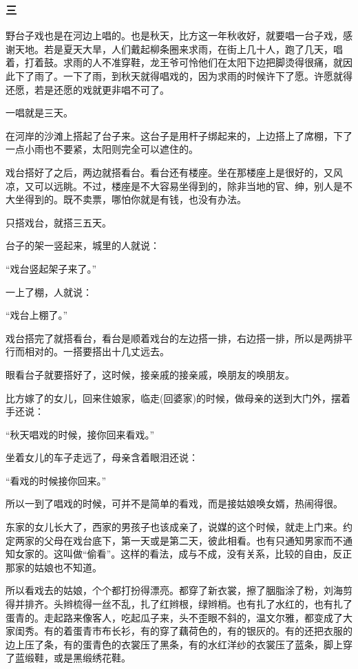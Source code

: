 \subsubsection*{三}
\par 野台子戏也是在河边上唱的。也是秋天，比方这一年秋收好，就要唱一台子戏，感谢天地。若是夏天大旱，人们戴起柳条圈来求雨，在街上几十人，跑了几天，唱着，打着鼓。求雨的人不准穿鞋，龙王爷可怜他们在太阳下边把脚烫得很痛，就因此下了雨了。一下了雨，到秋天就得唱戏的，因为求雨的时候许下了愿。许愿就得还愿，若是还愿的戏就更非唱不可了。
\par 一唱就是三天。
\par 在河岸的沙滩上搭起了台子来。这台子是用杆子绑起来的，上边搭上了席棚，下了一点小雨也不要紧，太阳则完全可以遮住的。
\par 戏台搭好了之后，两边就搭看台。看台还有楼座。坐在那楼座上是很好的，又风凉，又可以远眺。不过，楼座是不大容易坐得到的，除非当地的官、绅，别人是不大坐得到的。既不卖票，哪怕你就是有钱，也没有办法。
\par 只搭戏台，就搭三五天。
\par 台子的架一竖起来，城里的人就说：
\par “戏台竖起架子来了。”
\par 一上了棚，人就说：
\par “戏台上棚了。”
\par 戏台搭完了就搭看台，看台是顺着戏台的左边搭一排，右边搭一排，所以是两排平行而相对的。一搭要搭出十几丈远去。
\par 眼看台子就要搭好了，这时候，接亲戚的接亲戚，唤朋友的唤朋友。
\par 比方嫁了的女儿，回来住娘家，临走(回婆家)的时候，做母亲的送到大门外，摆着手还说：
\par “秋天唱戏的时候，接你回来看戏。”
\par 坐着女儿的车子走远了，母亲含着眼泪还说：
\par “看戏的时候接你回来。”
\par 所以一到了唱戏的时候，可并不是简单的看戏，而是接姑娘唤女婿，热闹得很。
\par 东家的女儿长大了，西家的男孩子也该成亲了，说媒的这个时候，就走上门来。约定两家的父母在戏台底下，第一天或是第二天，彼此相看。也有只通知男家而不通知女家的。这叫做“偷看”。这样的看法，成与不成，没有关系，比较的自由，反正那家的姑娘也不知道。
\par 所以看戏去的姑娘，个个都打扮得漂亮。都穿了新衣裳，擦了胭脂涂了粉，刘海剪得并排齐。头辫梳得一丝不乱，扎了红辫根，绿辫梢。也有扎了水红的，也有扎了蛋青的。走起路来像客人，吃起瓜子来，头不歪眼不斜的，温文尔雅，都变成了大家闺秀。有的着蛋青市布长衫，有的穿了藕荷色的，有的银灰的。有的还把衣服的边上压了条，有的蛋青色的衣裳压了黑条，有的水红洋纱的衣裳压了蓝条，脚上穿了蓝缎鞋，或是黑缎绣花鞋。
